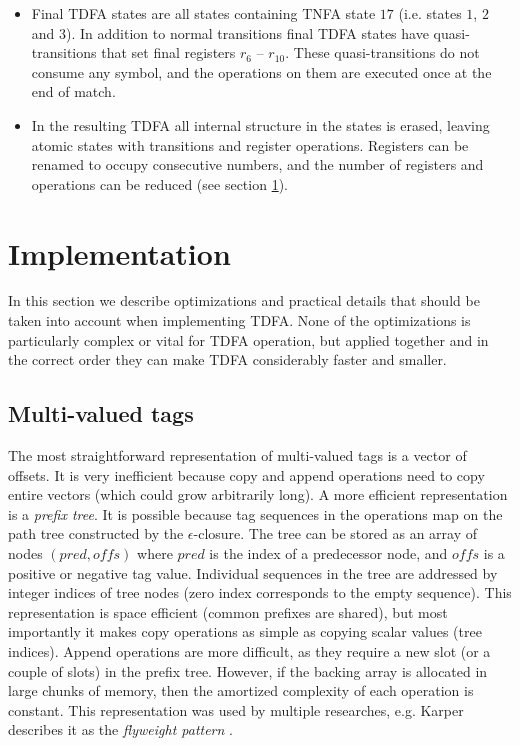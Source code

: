 \documentclass[]{article}
\begin{document}
\begin{itemize}
\item[\ding{212}]
Final TDFA states are all states containing TNFA state $17$ (i.e. states $1$, $2$ and $3$).
In addition to normal transitions final TDFA states have quasi-transitions
that set final registers $r_6$ -- $r_{10}$.
These quasi-transitions do not consume any symbol, and the operations on them are executed once at the end of match.
\medskip

\item[\ding{212}]
In the resulting TDFA all internal structure in the states is erased,
leaving atomic states with transitions and register operations.
Registers can be renamed to occupy consecutive numbers,
and the number of registers and operations can be reduced (see section \ref{section_impl}).
\medskip

\end{itemize}

\FloatBarrier

\section{Implementation}\label{section_impl}

In this section we describe optimizations and practical details that should be taken into account when implementing TDFA.
None of the optimizations is particularly complex or vital for TDFA operation,
but applied together and in the correct order they can make TDFA considerably faster and smaller.

\subsection{Multi-valued tags}

The most straightforward representation of multi-valued tags is a vector of offsets.
It is very inefficient because copy and append operations need to copy entire vectors (which could grow arbitrarily long).
A more efficient representation is a \emph{prefix tree}.
It is possible because tag sequences in the operations map on the path tree constructed by the $\epsilon$-closure.
The tree can be stored as an array of nodes $(pred, o\!f\!\!f\!s)$ where
$pred$ is the index of a predecessor node, and $o\!f\!\!f\!s$ is a positive or negative tag value.
Individual sequences in the tree are addressed by integer indices of tree nodes
(zero index corresponds to the empty sequence).
%
This representation is space efficient (common prefixes are shared),
but most importantly it makes copy operations as simple as copying scalar values (tree indices).
Append operations are more difficult, as they require a new slot (or a couple of slots) in the prefix tree.
However, if the backing array is allocated in large chunks of memory,
then the amortized complexity of each operation is constant.
%
This representation was used by multiple researches,
e.g. Karper describes it as the \emph{flyweight pattern} \cite{Kar14}.
\end{document}
